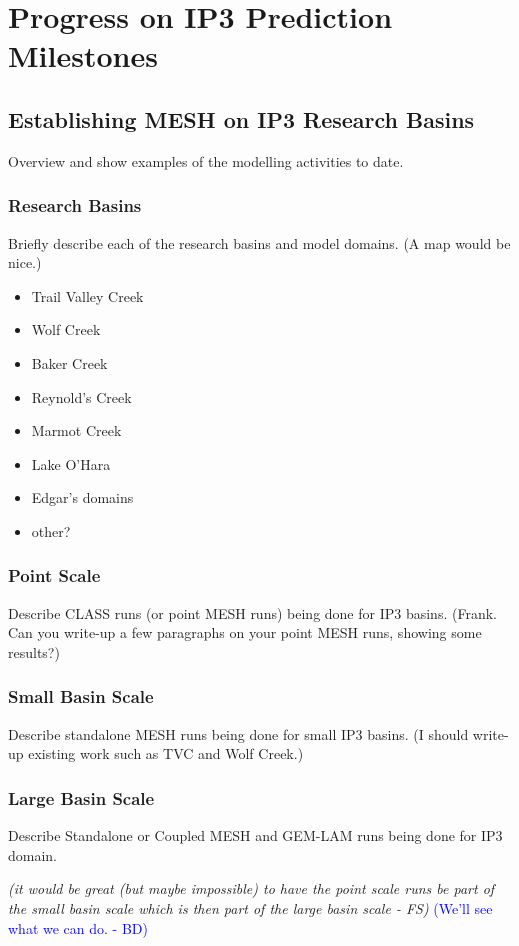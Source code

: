 \documentclass[hess]{copernicus}
\begin{document}
\section{Progress on IP3 Prediction Milestones}

\subsection{Establishing MESH on IP3 Research Basins}
Overview and show examples of the modelling activities to date.

\subsubsection{Research Basins}
Briefly describe each of the research basins and model domains. (A map would be nice.)

\begin{itemize}
	\item Trail Valley Creek
	\item Wolf Creek
	\item Baker Creek
	\item Reynold's Creek
	\item Marmot Creek
	\item Lake O'Hara
	\item Edgar's domains
	\item other?
\end{itemize}

\subsubsection{Point Scale}
Describe CLASS runs (or point MESH runs) being done for IP3 basins. (Frank. Can you write-up a few paragraphs on your point MESH runs, showing some results?)

\subsubsection{Small Basin Scale}
Describe standalone MESH runs being done for small IP3 basins. (I should write-up existing work such as TVC and Wolf Creek.)

\subsubsection{Large Basin Scale}
Describe Standalone or Coupled MESH and GEM-LAM runs being done for IP3 domain.

{\em (it would be great (but maybe impossible) to have the point scale runs be part of the small basin scale which is then part of the large basin scale - FS)}\textcolor{blue}{ (We'll see what we can do. - BD) }
\end{document}
